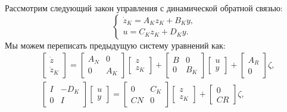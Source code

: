 Рассмотрим следующий закон управления с динамической обратной связью:
\begin{equation}
	\label{eq:part5_controller}
	\begin{cases}
		\dot{{z}}_K = {A}_K {z}_K + {B}_K {y},\\
		{u} = {C}_K {z}_K + {D}_K {y}.
	\end{cases}
\end{equation}
Мы можем переписать предыдущую систему уравнений как:
\begin{align}
	\label{eq:part5_system1}
	&\begin{bmatrix}
		{\dot{z}} \\ {\dot{z}}_K
	\end{bmatrix}
	=
	\begin{bmatrix}
		{A}_N & 0 \\
		0 & {A}_K
	\end{bmatrix}
	\begin{bmatrix}
		{z} \\ {z}_K 
	\end{bmatrix}
	+
	\begin{bmatrix}
		{B} & 0 \\
		0 & {B}_K 
	\end{bmatrix}
	\begin{bmatrix}
		{u} \\ {y}
	\end{bmatrix}
	+
	\begin{bmatrix}
		{A}_R \\ 0 
	\end{bmatrix}
	\zeta,
	\\
	\label{eq:part5_system2}
	& \begin{bmatrix}
		{I} & -{D}_K \\
		0 & {I}
	\end{bmatrix}
	\begin{bmatrix}
		{u} \\ {y}
	\end{bmatrix}
	=
	\begin{bmatrix}
		0 & {C}_K \\
		{C} {N} & 0
	\end{bmatrix}
	\begin{bmatrix}
		{z} \\ {z}_K
	\end{bmatrix}
	+
	\begin{bmatrix}
		0 \\ {C} {R}
	\end{bmatrix}{\zeta},
\end{align}
